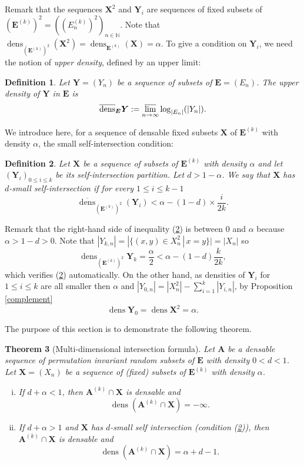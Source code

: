\documentclass{article}
\DeclareMathOperator{\dens}{dens}
\newcommand{\bs}{\boldsymbol}
\newtheorem{thm}{Theorem}[section]
\newtheorem{defi}[thm]{Definition}
\theoremstyle{remark}
\begin{document}
Remark that the sequences $\bs X^2$ and $\bs Y_i$ are sequences of fixed subsets of $(\bs E^{(k)})^2 = \left((E_n^{(k)})^2\right)_{n\in \mathbb{N}}$. Note that $\dens_{(\bs E^{(k)})^2} (\bs X^2) = \dens_{\bs E^{(k)}} (\bs X) = \alpha$. To give a condition on $\bs Y_i$, we need the notion of \textit{upper density}, defined by an upper limit:
 
\begin{defi} Let $\bs Y = (Y_n)$ be a sequence of subsets of $\bs E = (E_n)$. The upper density of $\bs Y$ in $\bs E$ is 
\[\overline{\dens}_{\bs E}\bs Y := \varlimsup_{n\to\infty}\log_{|E_n|}(|Y_{n}|).\]
\end{defi}

We introduce here, for a sequence of densable fixed subsets $\bs X$ of $\bs E^{(k)}$ with density $\alpha$, the small self-intersection condition: 

\begin{defi}\label{multidim condition} Let $\bs X$ be a sequence of subsets of $\bs E^{(k)}$ with density $\alpha$ and let $(\bs Y_i)_{0\leq i\leq k}$ be its self-intersection partition. Let $d > 1-\alpha$. We say that $\bs X$ has $d$-small self-intersection if for every $1\leq i \leq k-1$
\begin{equation}
    \overline{\dens}_{(\bs E^{(k)})^2}\left(\bs Y_i\right) < \alpha  - (1-d) \times \frac{i}{2k}.
\end{equation}
\end{defi}

Remark that the right-hand side of inequality (\ref{multidim condition}) is between $0$ and $\alpha$ because $\alpha > 1-d > 0$. Note that $|Y_{k,n}| = |\{(x,y)\in X_n^2\,|\, x = y\}|= |X_n|$ so \[\dens_{(\bs E^{(k)})^2} \bs Y_k = \frac{\alpha}{2} < \alpha-(1-d)\frac{k}{2k},\] which verifies (\ref{multidim condition}) automatically. On the other hand, as densities of $\bs Y_i$ for $1\leq i\leq k$ are all smaller then $\alpha$ and $|Y_{0,n}| = |X_n^2|-\sum_{i=1}^k|Y_{i,n}|$, by Proposition \ref{complement} \[\dens \bs Y_0 = \dens \bs X^2 = \alpha.\]
\quad

The purpose of this section is to demonstrate the following theorem. 
\begin{thm}[Multi-dimensional intersection formula] \label{multidim intersection} Let $\bs A$ be a densable sequence of permutation invariant random subsets of $\bs E$ with density $0<d<1$. Let $\bs X = (X_n)$ be a sequence of (fixed) subsets of $\bs E^{(k)}$ with density $\alpha$.
    \begin{enumerate}[(i)]
        \item If $d + \alpha <1$, then $\bs A^{(k)}\cap \bs X$ is densable and \[\dens (\bs A^{(k)}\cap \bs X) = -\infty.\]
        \item If $d + \alpha >1$ and $\bs X$ has $d$-small self intersection (condition (\ref{multidim condition})), then $\bs A^{(k)}\cap \bs X$ is densable and 
        \[\dens (\bs A^{(k)}\cap \bs X) = \alpha + d - 1.\]
    \end{enumerate} 
\end{thm}
\end{document}
